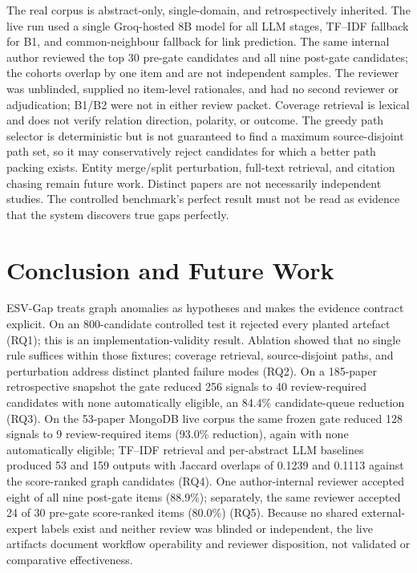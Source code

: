 \documentclass[conference, onecolumn]{IEEEtran}
\newcommand{\method}{ESV-Gap}
\begin{document}
The real corpus is abstract-only, single-domain, and retrospectively inherited. The live run used a single Groq-hosted 8B model for all LLM stages, TF--IDF fallback for B1, and common-neighbour fallback for link prediction. The same internal author reviewed the top 30 pre-gate candidates and all nine post-gate candidates; the cohorts overlap by one item and are not independent samples. The reviewer was unblinded, supplied no item-level rationales, and had no second reviewer or adjudication; B1/B2 were not in either review packet. Coverage retrieval is lexical and does not verify relation direction, polarity, or outcome. The greedy path selector is deterministic but is not guaranteed to find a maximum source-disjoint path set, so it may conservatively reject candidates for which a better path packing exists. Entity merge/split perturbation, full-text retrieval, and citation chasing remain future work. Distinct papers are not necessarily independent studies. The controlled benchmark's perfect result must not be read as evidence that the system discovers true gaps perfectly.

\section{Conclusion and Future Work}

\method{} treats graph anomalies as hypotheses and makes the evidence contract explicit. On an 800-candidate controlled test it rejected every planted artefact (RQ1); this is an implementation-validity result. Ablation showed that no single rule suffices within those fixtures; coverage retrieval, source-disjoint paths, and perturbation address distinct planted failure modes (RQ2). On a 185-paper retrospective snapshot the gate reduced 256 signals to 40 review-required candidates with none automatically eligible, an 84.4\% candidate-queue reduction (RQ3). On the 53-paper MongoDB live corpus the same frozen gate reduced 128 signals to 9 review-required items (93.0\% reduction), again with none automatically eligible; TF--IDF retrieval and per-abstract LLM baselines produced 53 and 159 outputs with Jaccard overlaps of 0.1239 and 0.1113 against the score-ranked graph candidates (RQ4). One author-internal reviewer accepted eight of all nine post-gate items (88.9\%); separately, the same reviewer accepted 24 of 30 pre-gate score-ranked items (80.0\%) (RQ5). Because no shared external-expert labels exist and neither review was blinded or independent, the live artifacts document workflow operability and reviewer disposition, not validated or comparative effectiveness.
\end{document}
